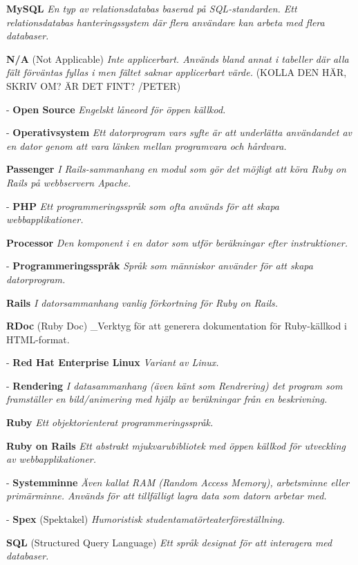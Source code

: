 \documentclass[a4paper, twoside, 11pt, titlepage]{article}
\begin{document}
\textbf{MySQL} \emph{En typ av relationsdatabas baserad på SQL-standarden. Ett relationsdatabas hanteringssystem där flera användare kan arbeta med flera databaser.}

\textbf{N/A} (Not Applicable) \emph{Inte applicerbart. Används bland annat i tabeller där alla fält förväntas fyllas i men fältet saknar applicerbart värde.} (KOLLA DEN HÄR, SKRIV OM? ÄR DET FINT? /PETER)

- \textbf{Open Source} \emph{Engelskt låneord för öppen källkod.}

- \textbf{Operativsystem} \emph{Ett datorprogram vars syfte är att underlätta användandet av en dator genom att vara länken mellan programvara och hårdvara.}

\textbf{Passenger} \emph{I Rails-sammanhang en modul som gör det möjligt att köra Ruby on Rails på webbservern Apache.}

- \textbf{PHP} \emph{Ett programmeringsspråk som ofta används för att skapa webbapplikationer.}

\textbf{Processor} \emph{Den komponent i en dator som utför beräkningar efter instruktioner.}

- \textbf{Programmeringsspråk} \emph{Språk som människor använder för att skapa datorprogram.}

\textbf{Rails} \emph{I datorsammanhang vanlig förkortning för Ruby on Rails.}

\textbf{RDoc} (Ruby Doc) \_Verktyg för att generera dokumentation för Ruby-källkod i HTML-format.

- \textbf{Red Hat Enterprise Linux} \emph{Variant av Linux.}

- \textbf{Rendering} \emph{I datasammanhang (även känt som Rendrering) det program som framställer en bild/animering med hjälp av beräkningar från en beskrivning.}

\textbf{Ruby} \emph{Ett objektorienterat programmeringsspråk.}

\textbf{Ruby on Rails} \emph{Ett abstrakt mjukvarubibliotek med öppen källkod för utveckling av webbapplikationer.}

- \textbf{Systemminne} \emph{Även kallat RAM (Random Access Memory), arbetsminne eller primärminne. Används för att tillfälligt lagra data som datorn arbetar med.}

- \textbf{Spex} (Spektakel) \emph{Humoristisk studentamatörteaterföreställning.}

\textbf{SQL} (Structured Query Language) \emph{Ett språk designat för att interagera med databaser.}
\end{document}
